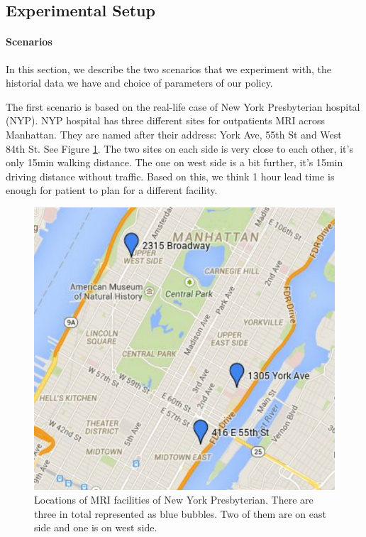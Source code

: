 \subsection{Experimental Setup}

\paragraph{Scenarios}

In this section, we describe the two scenarios that we experiment with,
the historial data we have and choice of parameters of our policy.

The first scenario is based on the real-life case of New York Presbyterian
hospital (NYP). NYP hospital has three different sites for outpatients MRI
across Manhattan. They are named after their address: York Ave, 55th St and
West 84th St. See Figure \ref{fig:site}. The two sites on each side is very
close to each other, it's only 15min walking distance. The one on west side
is a bit further, it's 15min driving distance without traffic.
Based on this, we think 1 hour lead time is enough for patient to
plan for a different facility.

\begin{figure}
\centering
\includegraphics[scale=.6]{chap3/numeric/pic/site.pdf}
\caption{Locations of MRI facilities of New York Presbyterian. There
are three in total represented as blue bubbles. Two of them are on
east side and one is on west side.}
\label{fig:site}
\end{figure}

